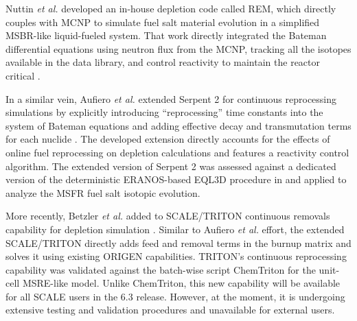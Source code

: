 Nuttin \emph{et al.} developed an in-house depletion code called REM, which 
directly couples with \gls{MCNP} \cite{werner_mcnp_2017-1} to simulate fuel 
salt material evolution in a simplified \gls{MSBR}-like liquid-fueled system. 
That work directly integrated the Bateman differential equations using neutron 
flux from the \gls{MCNP}, tracking all the isotopes available in the data 
library, and control reactivity to maintain the reactor critical  
\cite{nuttin_potential_2005}.

In a similar vein, Aufiero \emph{et al.} extended Serpent 2 for continuous 
reprocessing simulations by explicitly introducing ``reprocessing'' time 
constants into the system of Bateman equations and adding effective decay and 
transmutation terms for each nuclide \cite{aufiero_extended_2013}. The 
developed extension directly accounts for the effects of online fuel 
reprocessing on depletion calculations and features a reactivity control 
algorithm. The extended version of Serpent 2 was assessed against a dedicated 
version of the deterministic ERANOS-based EQL3D procedure in 
\cite{fiorina_investigation_2013} and applied to analyze the \gls{MSFR} fuel 
salt isotopic evolution.

More recently, Betzler \emph{et al.} added to SCALE/TRITON continuous removals 
capability for depletion simulation \cite{betzler_molten_2019}. Similar to 
Aufiero \emph{et al.} effort, the extended SCALE/TRITON directly adds feed and 
removal terms in the burnup matrix and solves it using existing ORIGEN 
capabilities. TRITON's continuous reprocessing capability was validated 
against the batch-wise script ChemTriton for the unit-cell \gls{MSRE}-like 
model. Unlike ChemTriton, this new capability will be available for all SCALE 
users in the 6.3 release. However, at the moment, it is undergoing extensive 
testing and validation procedures and unavailable for external users.

